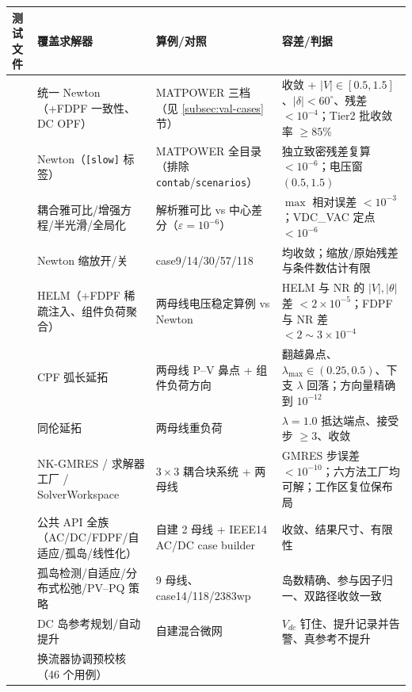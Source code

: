 \begin{footnotesize}
\begin{longtable}{@{}L{3.9cm}L{3.2cm}L{3.5cm}L{4.4cm}@{}}
\toprule
测试文件 & 覆盖求解器 & 算例/对照 & 容差/判据\\
\midrule
\endhead
{} & 统一 Newton（+FDPF 一致性、DC OPF） &
  MATPOWER 三档（见 \ref{subsec:val-cases} 节）&
  收敛 + $|V|\in[0.5,1.5]$、$|\delta|<60^\circ$、残差 $<10^{-4}$；Tier2 批收敛率 $\ge 85\%$\\
 & Newton（\texttt{[slow]} 标签）&
  MATPOWER 全目录（排除 \texttt{contab}/\texttt{scenarios}）&
  独立致密残差复算 $<10^{-6}$；电压窗 $(0.5,1.5)$\\
 & 耦合雅可比/增强方程/半光滑/全局化 &
  解析雅可比 vs 中心差分（$\varepsilon=10^{-6}$）&
  $\max$ 相对误差 $<10^{-3}$；VDC\_VAC 定点 $<10^{-6}$\\
 & Newton 缩放开/关 &
  case9/14/30/57/118 &
  均收敛；缩放/原始残差与条件数估计有限\\
 & HELM（+FDPF 稀疏注入、组件负荷聚合）&
  两母线电压稳定算例 vs Newton &
  HELM 与 NR 的 $|V|,|\theta|$ 差 $<2\times10^{-5}$；FDPF 与 NR 差 $<2\sim3\times10^{-4}$\\
 & CPF 弧长延拓 &
  两母线 P--V 鼻点 + 组件负荷方向 &
  翻越鼻点、$\lambda_{\max}\in(0.25,0.5)$、下支 $\lambda$ 回落；方向量精确到 $10^{-12}$\\
 & 同伦延拓 &
  两母线重负荷 &
  $\lambda=1.0$ 抵达端点、接受步 $\ge3$、收敛\\
 & NK-GMRES / 求解器工厂 / SolverWorkspace &
  $3\times3$ 耦合块系统 + 两母线 &
  GMRES 步误差 $<10^{-10}$；六方法工厂均可解；工作区复位保布局\\
 & 公共 API 全族（AC/DC/FDPF/自适应/孤岛/线性化）&
  自建 2 母线 + IEEE14 AC/DC case builder &
  收敛、结果尺寸、有限性\\
 & 孤岛检测/自适应/分布式松弛/PV--PQ 策略 &
  9 母线、case14/118/2383wp &
  岛数精确、参与因子归一、双路径收敛一致\\
 & DC 岛参考规划/自动提升 &
  自建混合微网 &
  $V_{dc}$ 钉住、提升记录并告警、真参考不提升\\
 & 换流器协调预校核（46 个用例）&

\end{longtable}
\end{footnotesize}
